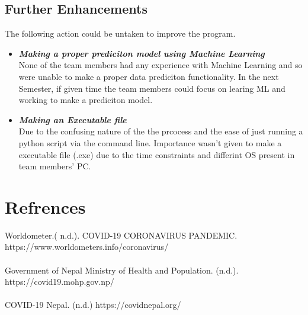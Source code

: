 \documentclass[12pt]{article}
\begin{document}
\subsection{Further Enhancements}
\vspace*{5mm}
The following action could be untaken to improve the program.
\begin{itemize}
    \item \textit{\textbf{Making a proper prediciton model using Machine Learning}}\\
        None of the team members had any experience with Machine Learning and so were unable to make a proper data prediciton functionality. In the next Semester, if given time 
        the team members could focus on learing ML and working to make a prediciton model.
    \item \textit{\textbf{Making an Executable file}}\\
        Due to the confusing nature of the the prcocess and the ease of just running a python script via the command line. Importance wasn't given to make a  executable file (.exe)
        due to the time constraints and differint OS present in team members' PC.  
\end{itemize}
\clearpage

\section{Refrences}
\thispagestyle{empty}
Worldometer.( n.d.). COVID-19 CORONAVIRUS PANDEMIC.
\\https://www.worldometers.info/coronavirus/
\\\\
Government of Nepal Ministry of Health and Population. (n.d.). https://covid19.mohp.gov.np/
\\\\
COVID-19 Nepal. (n.d.) https://covidnepal.org/

\clearpage
\thispagestyle{empty}
\end{document}

